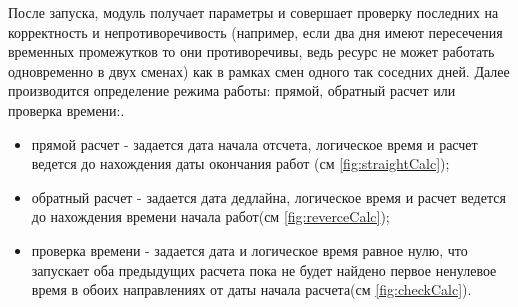 \indent После запуска, модуль получает параметры и совершает проверку последних на корректность и непротиворечивость (например, если два дня имеют пересечения временных промежутков то они противоречивы, ведь ресурс не может работать одновременно в двух сменах) как в рамках смен одного так соседних дней.
Далее производится определение режима работы: прямой, обратный расчет или проверка времени:.

\begin{itemize}
	\item прямой расчет - задается дата начала отсчета, логическое время и расчет ведется до нахождения даты окончания работ (см \ref{fig:straightCalc});
	\item обратный расчет - задается дата дедлайна, логическое время и расчет ведется до нахождения времени начала работ(см \ref{fig:reverceCalc});
	\item проверка времени - задается дата и логическое время равное нулю, что запускает оба предыдущих расчета пока не будет найдено первое ненулевое время в обоих направлениях от даты начала расчета(см \ref{fig:checkCalc}).
\end{itemize}

